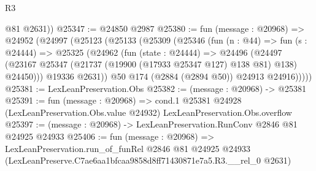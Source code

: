 \begin{lexlean}{R3}
\begin{coremodule}
        @81
        @2631))
@25347 := @24850 @2987
@25380 := fun (message : @20968) =>
  @24952
    (@24997
      (@25123
        (@25133
          (@25309
            (@25346
              (fun (n : @44) =>
              fun (s : @24444) =>
              @25325
                (@24962
                  (fun (state : @24444) =>
                  @24496
                    (@24497
                      (@23167 @25347 (@21737 (@19900 (@17933 @25347 @127) @138 @81) @138) @24450)))
                  @19336
                  @2631))
              @50
              @174
              (@2884 (@2894 @50))
              @24913
              @24916)))))
@25381 := LexLeanPreservation.Obs
@25382 := (message : @20968) -> @25381
@25391 := fun (message : @20968) =>
  cond.{1} @25381 @24928 (LexLeanPreservation.Obs.value @24932) LexLeanPreservation.Obs.overflow
@25397 := (message : @20968) -> LexLeanPreservation.RunConv @2846 @81 @24925 @24933
@25406 := fun (message : @20968) =>
  LexLeanPreservation.run_of_funRel
    @2846
    @81
    @24925
    @24933
    (LexLeanPreserve.C7ae6aa1bfcaa9858d8ff71430871e7a5.R3.__rel_0 @2631)
\end{coremodule}
\end{lexlean}
